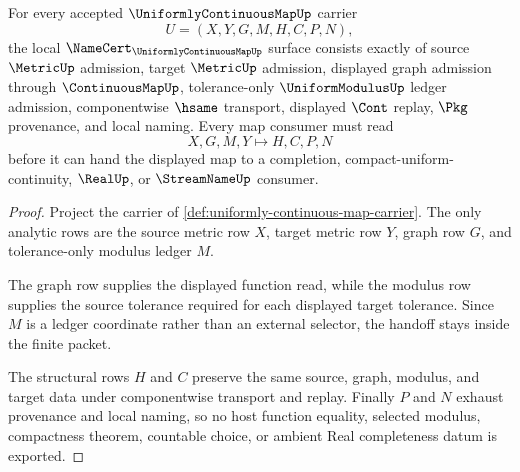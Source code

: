 \begin{theorem}
\label{thm:uniformly-continuous-map-namecert-obligations}
For every accepted $\UniformlyContinuousMapUp$ carrier
$$
U=(X,Y,G,M,H,C,P,N),
$$
the local $\NameCert_{\UniformlyContinuousMapUp}$ surface consists exactly of source $\MetricUp$ admission, target $\MetricUp$ admission, displayed graph admission through $\ContinuousMapUp$, tolerance-only $\UniformModulusUp$ ledger admission, componentwise $\hsame$ transport, displayed $\Cont$ replay, $\Pkg$ provenance, and local naming. Every map consumer must read
$$
X,G,M,Y \longmapsto H,C,P,N
$$
before it can hand the displayed map to a completion, compact-uniform-continuity, $\RealUp$, or $\StreamNameUp$ consumer.
\end{theorem}
\begin{proof}
Project the carrier of \autoref{def:uniformly-continuous-map-carrier}. The only analytic rows are the source metric row $X$, target metric row $Y$, graph row $G$, and tolerance-only modulus ledger $M$.

The graph row supplies the displayed function read, while the modulus row supplies the source tolerance required for each displayed target tolerance. Since $M$ is a ledger coordinate rather than an external selector, the handoff stays inside the finite packet.

The structural rows $H$ and $C$ preserve the same source, graph, modulus, and target data under componentwise transport and replay. Finally $P$ and $N$ exhaust provenance and local naming, so no host function equality, selected modulus, compactness theorem, countable choice, or ambient Real completeness datum is exported.
\end{proof}

